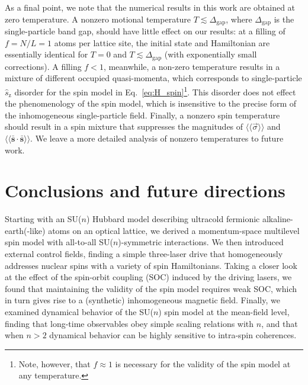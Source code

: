\documentclass[aps,pra,nofootinbib,twocolumn,superscriptaddress]{revtex4-2}
\renewcommand{\t}{\text} %
\newcommand{\bbk}[1]{\langle\!\langle #1 \rangle\!\rangle}
\newcommand{\1}{\mathds{1}}
\newcommand{\s}{\hat{s}}
\newcommand{\z}{\text{z}}
\newcommand{\sds}{\bar{\bm{s}}\cdot\bar{\bm{s}}}
\begin{document}
As a final point, we note that the numerical results in this work are obtained at zero temperature.
A nonzero motional temperature $T\lesssim\Delta_{\t{gap}}$, where $\Delta_{\t{gap}}$ is the single-particle band gap, should have little effect on our results: at a filling of $f=N/L=1$ atoms per lattice site, the initial state and Hamiltonian are essentially identical for $T=0$ and $T\lesssim\Delta_{\t{gap}}$ (with exponentially small corrections).
A filling $f<1$, meanwhile, a non-zero temperature results in a mixture of different occupied quasi-momenta, which corresponds to single-particle $\s_\z$ disorder for the spin model in Eq.~\eqref{eq:H_spin}\footnote{
Note, however, that $f\approx1$ is necessary for the validity of the spin model at any temperature.
}.
This disorder does not effect the phenomenology of the spin model, which is insensitive to the precise form of the inhomogeneous single-particle field.
Finally, a nonzero spin temperature should result in a spin mixture that suppresses the magnitudes of $\bbk{\vec\sigma}$ and $\bbk{\sds}$.
We leave a more detailed analysis of nonzero temperatures to future work.

\section{Conclusions and future directions}
\label{sec:conclusions}

Starting with an SU($n$) Hubbard model describing ultracold fermionic alkaline-earth(-like) atoms on an optical lattice, we derived a momentum-space multilevel spin model with all-to-all SU($n$)-symmetric interactions.
We then introduced external control fields, finding a simple three-laser drive that homogeneously addresses nuclear spins with a variety of spin Hamiltonians.
Taking a closer look at the effect of the spin-orbit coupling (SOC) induced by the driving lasers, we found that maintaining the validity of the spin model requires weak SOC, which in turn gives rise to a (synthetic) inhomogeneous magnetic field.
Finally, we examined dynamical behavior of the SU($n$) spin model at the mean-field level, finding that long-time observables obey simple scaling relations with $n$, and that when $n>2$ dynamical behavior can be highly sensitive to intra-spin coherences.
\end{document}
